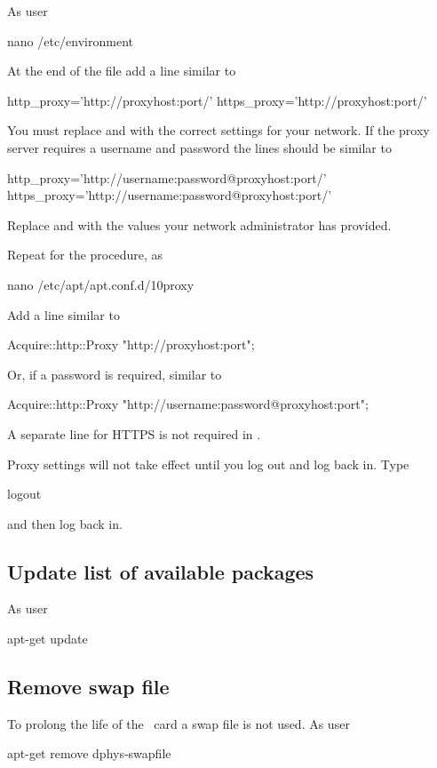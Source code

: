 As user \rootUser
\begin{Cmd}
nano /etc/environment  
\end{Cmd}

At the end of the file add a line similar to
\begin{Cmd}
http_proxy='http://proxyhost:port/'
https_proxy='http://proxyhost:port/'
\end{Cmd}
You must replace  and  with the correct
settings for your network. If the proxy server requires a username and
password the lines should be similar to
\begin{Cmd}
http_proxy='http://username:password@proxyhost:port/'
https_proxy='http://username:password@proxyhost:port/'
\end{Cmd}
Replace  and  with the values your
network administrator has provided.

Repeat for the procedure, as \rootUser
\begin{Cmd}
nano /etc/apt/apt.conf.d/10proxy
\end{Cmd}

Add a line similar to
\begin{Cmd}
Acquire::http::Proxy "http://proxyhost:port";
\end{Cmd}
Or, if a password is required, similar to
\begin{Cmd}
Acquire::http::Proxy "http://username:password@proxyhost:port";
\end{Cmd}
A separate line for HTTPS is not required in
.

Proxy settings will not take effect until you log out and log back
in. Type
\begin{Cmd}
logout
\end{Cmd}
and then log back in.

\subsection{Update list of available packages}
As user \rootUser
\begin{Cmd}
apt-get update  
\end{Cmd}

\subsection{Remove swap file}
To prolong the life of the \sd\ card a swap file is not used. As user
\rootUser
\begin{Cmd}
apt-get remove dphys-swapfile  
\end{Cmd}

